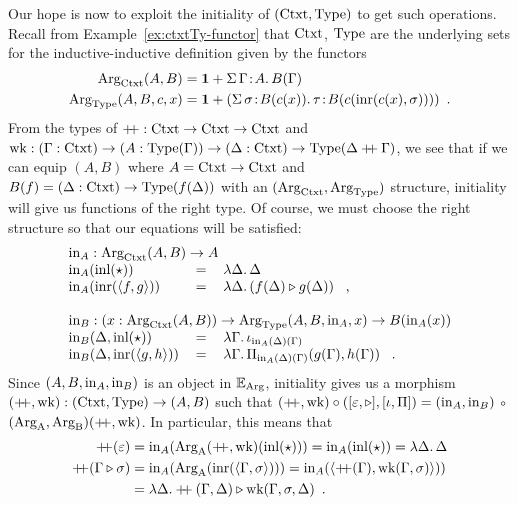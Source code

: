 \documentclass[orivec,envcountsame, ,envcountsect]{llncs}
\begin{document}
Our hope is now to exploit the initiality of $(\text{Ctxt}, \text{Type})$ to get
such operations. Recall from Example~\ref{ex:ctxtTy-functor} that
$\text{Ctxt}$, $\text{Type}$ are the underlying sets for the inductive-inductive
definition given by the functors
\begin{align*}
  \text{Arg}_{\text{Ctxt}}(A, B) &= \mathbf{1} + \Sigma\, \Gamma\!:\!A .\, B(\Gamma)\\
  \text{Arg}_{\text{Type}}(A, B, c, x) &= \mathbf{1} + (\Sigma\,  \sigma\!:\! B(c(x)).\, \tau\!:\!B(c(\text{inr}(c(x), \sigma))) ) \enspace .
\end{align*} 
From the types of $\mathbin{+\mkern-6mu+} : \text{Ctxt} \to \text{Ctxt} \to \text{Ctxt}$ and $\text{wk} :
(\Gamma : \text{Ctxt}) \to (A : \text{Type}(\Gamma)) \to (\Delta : \text{Ctxt}) \to
\text{Type}(\Delta \mathbin{+\mkern-6mu+} \Gamma)$, we see that if we can equip $(A,
B)$ where $A = \text{Ctxt} \to \text{Ctxt}$ and $B(f) = (\Delta : \text{Ctxt}) \to
\text{Type}(f(\Delta))$ with an $(\text{Arg}_{\text{Ctxt}}, \text{Arg}_{\text{Type}})$ structure, initiality
will give us functions of the right type. Of course, we must choose
the right structure so that our equations will be satisfied:
\[
\begin{tabular}{lcl}
  \multicolumn{3}{l}{$\inn_A : \ArgCtxt(A, B) \to A$} \\
  $\inn_A(\inl(\oneelt))$ &$=$& $\lambda \Delta .\, \Delta$ \\
  $\inn_A(\inr(\langle f , g\rangle))$ &$=$& $\lambda \Delta .\, (\consCtxt{f(\Delta)}{g(\Delta)})$ \enspace ,\\
\\
  \multicolumn{3}{l}{$\inn_B : (x : \ArgCtxt(A, B)) \to \ArgType(A, B, \inn_A, x) \to B(\inn_A(x))$} \\
  $\inn_B(\Delta, \inl(\oneelt))$ &$=$& $\lambda \Gamma .\, \baseTy{\inn_A(\Delta)(\Gamma)}$ \\
  $\inn_B(\Delta, \inr(\langle g , h\rangle))$ &$=$& $\lambda \Gamma .\, \piTy{\inn_A(\Delta)(\Gamma)}{g(\Gamma)}{h(\Gamma)}$ \enspace .
\end{tabular}
\]
Since $(A, B, \text{in}_A, \text{in}_B)$ is an object in
$\mathbb{E}_{\text{Arg}}$, initiality gives us a morphism \\ %
$(\mathbin{+\mkern-6mu+}, \text{wk}) : (\text{Ctxt}, \text{Type}) \to (A, B)$ such that
$(\mathbin{+\mkern-6mu+}, \text{wk}) \circ ([\varepsilon, \triangleright],
[\iota, \Pi]) = (\text{in}_A, \text{in}_B)$ $\circ$
$(\text{Arg}_{\text{A}}, \text{Arg}_{\text{B}})(\mathbin{+\mkern-6mu+}, \text{wk})$.  In particular, this means that
\begin{align*}
\mathbin{+\mkern-6mu+}(\varepsilon) 
 &= \text{in}_A(\text{Arg}_{\text{A}}(\mathbin{+\mkern-6mu+}, \text{wk})(\text{inl}(\star)))
  = \text{in}_A(\text{inl}(\star))
  = \lambda \Delta.\, \Delta \\
\mathbin{+\mkern-6mu+}(\Gamma \triangleright \sigma)
 &= \text{in}_A(\text{Arg}_{\text{A}}(\text{inr}(\langle\Gamma, \sigma\rangle)))
  = \text{in}_A(\langle \mathbin{+\mkern-6mu+}(\Gamma), \text{wk}(\Gamma, \sigma)\rangle)) \\
  &= \lambda \Delta . \mathbin{+\mkern-6mu+}(\Gamma, \Delta) \triangleright \text{wk}(\Gamma, \sigma, \Delta) \enspace .
\end{align*}
\end{document}
